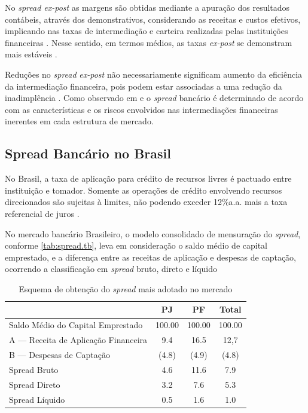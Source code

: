 \documentclass[12pt,openright,oneside,a4paper,chapter=TITLE,section=TITLE,subsection=TITLE,english,french,spanish,portugues,sumario=tradicional]{04-class-files/abntex2}
\begin{document}
No \emph{spread ex-post} as margens são obtidas mediante a apuração dos resultados
contábeis, através dos demonstrativos, considerando as receitas e custos
efetivos, implicando nas taxas de intermediação e carteira realizadas pelas
instituições financeiras \cite{kunt:1999, durigan:2018}. Nesse sentido, em
termos médios, as taxas \emph{ex-post} se demonstram mais estáveis \cite{leal:2006, dantas:2012}.

Reduções no \emph{spread} \emph{ex-post} não necessariamente significam aumento da
eficiência da intermediação financeira, pois podem estar associadas a uma
redução da inadimplência \cite{kunt:1999}. Como observado em
\textcite{klein:1971} e \textcite{ho-saunders:1981} o \emph{spread} bancário é
determinado de acordo com as características e os riscos envolvidos nas
intermediações financeiras inerentes em cada estrutura de mercado.

\subsection{Spread Bancário no Brasil}

No Brasil, a taxa de aplicação para crédito de recursos livres é pactuado entre
instituição e tomador. Somente as operações de crédito envolvendo recursos
direcionados são sujeitas à limites, não podendo exceder 12\%a.a. mais a taxa
referencial de juros \cite{BCB:2016}.

No mercado bancário Brasileiro, o modelo consolidado de mensuração do \emph{spread},
conforme \autoref{tab:spread.tb}, leva em consideração o saldo médio de capital
emprestado, e a diferença entre as receitas de aplicação e despesas de
captação, ocorrendo a classificação em \emph{spread} bruto, direto e líquido
\cite{fipecafi:2005}

\begin{table}[b]
 \centering
   \caption{Esquema de obtenção do \emph{spread} mais adotado no mercado} 
    \label{tab:spread.tb}
     \begin{tabular}{l|c|c|c}
      \hline
                                           &   PJ   &   PF    & Total \\
       \hline
       Saldo Médio do Capital Emprestado   & 100.00 & 100.00  & 100.00 \\
       A — Receita de Aplicação Financeira & 9.4    & 16.5    & 12,7   \\
       B — Despesas de Captação            & (4.8)  & (4.9)   & (4.8)  \\   
       Spread Bruto                        & 4.6    & 11.6    & 7.9    \\
       Spread Direto                       & 3.2    & 7.6     & 5.3    \\
       Spread Líquido                      & 0.5    & 1.6     & 1.0    \\
       \hline
       \end{tabular}
\end{table}
\end{document}
